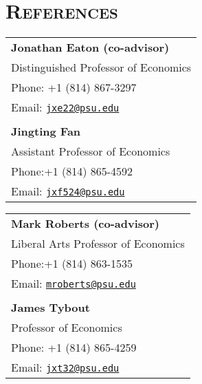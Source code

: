 \documentclass[letterpaper]{article}
\begin{document}
\section*{\textsc{References}}
\begin{minipage}{0.5\linewidth}
    \begin{tabular}{l}
        \textbf{Jonathan Eaton (co-advisor)}  \\
         Distinguished Professor of Economics \\
         Phone: +1 (814) 867-3297 \\
         Email: \href{mailto:jxe22@psu.edu}{\tt jxe22@psu.edu}\\
           \\
         \textbf{Jingting Fan}\\
         Assistant Professor of Economics  \\
         Phone:+1 (814) 865-4592 \\
         Email: \href{mailto:jxf524@psu.edu}{\tt jxf524@psu.edu} 
    \end{tabular}
\end{minipage}
\begin{minipage}{0.5\linewidth}
    \begin{tabular}{l}
   \textbf{Mark Roberts (co-advisor)} \\
     Liberal Arts Professor of Economics\\
 Phone:+1 (814) 863-1535 \\
 Email: \href{mailto:mroberts@psu.edu}{\tt mroberts@psu.edu}  \\
\\
   \textbf{James Tybout}  \\
Professor of Economics     \\
Phone: +1 (814) 865-4259  \\
Email: \href{mailto:jxt32@psu.edu}{\tt jxt32@psu.edu}
    \end{tabular}
\end{minipage}



\end{document}
